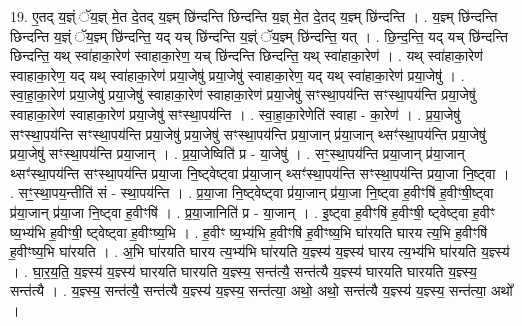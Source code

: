 \documentclass[17pt]{extarticle}
\begin{document}
19. ए॒तद् य॒ज्ञ्ं ॅय॒ज्ञ् मे॒त दे॒तद् य॒ज्ञ्म् छि॑न्दन्ति छिन्दन्ति य॒ज्ञ् मे॒त दे॒तद् य॒ज्ञ्म् छि॑न्दन्ति । . य॒ज्ञ्म् छि॑न्दन्ति छिन्दन्ति य॒ज्ञ्ं ॅय॒ज्ञ्म् छि॑न्दन्ति॒ यद् यच् छि॑न्दन्ति य॒ज्ञ्ं ॅय॒ज्ञ्म् छि॑न्दन्ति॒ यत् । . छि॒न्द॒न्ति॒ यद् यच् छि॑न्दन्ति छिन्दन्ति॒ यथ् स्वा॑हाका॒रेण॑ स्वाहाका॒रेण॒ यच् छि॑न्दन्ति छिन्दन्ति॒ यथ् स्वा॑हाका॒रेण॑ । . यथ् स्वा॑हाका॒रेण॑ स्वाहाका॒रेण॒ यद् यथ् स्वा॑हाका॒रेण॑ प्रया॒जेषु॑ प्रया॒जेषु॑ स्वाहाका॒रेण॒ यद् यथ् स्वा॑हाका॒रेण॑ प्रया॒जेषु॑ । . स्वा॒हा॒का॒रेण॑ प्रया॒जेषु॑ प्रया॒जेषु॑ स्वाहाका॒रेण॑ स्वाहाका॒रेण॑ प्रया॒जेषु॑ सꣳस्था॒पय॑न्ति सꣳस्था॒पय॑न्ति प्रया॒जेषु॑ स्वाहाका॒रेण॑ स्वाहाका॒रेण॑ प्रया॒जेषु॑ सꣳस्था॒पय॑न्ति । . स्वा॒हा॒का॒रेणेति॑ स्वाहा - का॒रेण॑ । . प्र॒या॒जेषु॑ सꣳस्था॒पय॑न्ति सꣳस्था॒पय॑न्ति प्रया॒जेषु॑ प्रया॒जेषु॑ सꣳस्था॒पय॑न्ति प्रया॒जान् प्र॑या॒जान् थ्सꣳ॑स्था॒पय॑न्ति प्रया॒जेषु॑ प्रया॒जेषु॑ सꣳस्था॒पय॑न्ति प्रया॒जान् । . प्र॒या॒जेष्विति॑ प्र - या॒जेषु॑ । . सꣳ॒॒स्था॒पय॑न्ति प्रया॒जान् प्र॑या॒जान् थ्सꣳ॑स्था॒पय॑न्ति सꣳस्था॒पय॑न्ति प्रया॒जा नि॒ष्ट्वेष्ट्वा प्र॑या॒जान् थ्सꣳ॑स्था॒पय॑न्ति सꣳस्था॒पय॑न्ति प्रया॒जा नि॒ष्ट्वा । . सꣳ॒॒स्था॒पय॒न्तीति॑ सं - स्था॒पय॑न्ति । . प्र॒या॒जा नि॒ष्ट्वेष्ट्वा प्र॑या॒जान् प्र॑या॒जा नि॒ष्ट्वा ह॒वीꣳषि॑ ह॒वीꣳषी॒ष्ट्वा प्र॑या॒जान् प्र॑या॒जा नि॒ष्ट्वा ह॒वीꣳषि॑ । . प्र॒या॒जानिति॑ प्र - या॒जान् । . इ॒ष्ट्वा ह॒वीꣳषि॑ ह॒वीꣳषी॒ ष्ट्वेष्ट्वा ह॒वीꣳ ष्य॒भ्य॑भि ह॒वीꣳषी॒ ष्ट्वेष्ट्वा ह॒वीꣳष्य॒भि । . ह॒वीꣳ ष्य॒भ्य॑भि ह॒वीꣳषि॑ ह॒वीꣳष्य॒भि घा॑रयति घारय त्य॒भि ह॒वीꣳषि॑ ह॒वीꣳष्य॒भि घा॑रयति । . अ॒भि घा॑रयति घारय त्य॒भ्य॑भि घा॑रयति य॒ज्ञ्स्य॑ य॒ज्ञ्स्य॑ घारय त्य॒भ्य॑भि घा॑रयति य॒ज्ञ्स्य॑ । . घा॒र॒य॒ति॒ य॒ज्ञ्स्य॑ य॒ज्ञ्स्य॑ घारयति घारयति य॒ज्ञ्स्य॒ सन्त॑त्यै॒ सन्त॑त्यै य॒ज्ञ्स्य॑ घारयति घारयति य॒ज्ञ्स्य॒ सन्त॑त्यै । . य॒ज्ञ्स्य॒ सन्त॑त्यै॒ सन्त॑त्यै य॒ज्ञ्स्य॑ य॒ज्ञ्स्य॒ सन्त॑त्या॒ अथो॒ अथो॒ सन्त॑त्यै य॒ज्ञ्स्य॑ य॒ज्ञ्स्य॒ सन्त॑त्या॒ अथो᳚ । \newline
\end{document}
